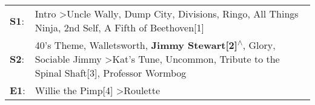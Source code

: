\begin{supertabular}{p{0.03\textwidth}p{0.92\textwidth}}
 \textbf{S1}:  &                                                                                    Intro\textsuperscript{} \textgreater \enspace Uncle Wally\textsuperscript{}, \enspace Dump City\textsuperscript{}, \enspace Divisions\textsuperscript{}, \enspace Ringo\textsuperscript{}, \enspace All Things Ninja\textsuperscript{}, \enspace 2nd Self\textsuperscript{}, \enspace A Fifth of Beethoven[1]\textsuperscript{}  \enspace  \\
 \textbf{S2}:  &  40's Theme\textsuperscript{}, \enspace Walletsworth\textsuperscript{}, \enspace \textbf{Jimmy Stewart[2]\textsuperscript{$\wedge$}}, \enspace Glory\textsuperscript{}, \enspace Sociable Jimmy\textsuperscript{} \textgreater \enspace Kat's Tune\textsuperscript{}, \enspace Uncommon\textsuperscript{}, \enspace Tribute to the Spinal Shaft[3]\textsuperscript{}, \enspace Professor Wormbog\textsuperscript{}  \enspace  \\
 \textbf{E1}:  &                                                                                                                                                                                                                                                                                                                              Willie the Pimp[4]\textsuperscript{} \textgreater \enspace Roulette\textsuperscript{}  \enspace  \\
\end{supertabular}
